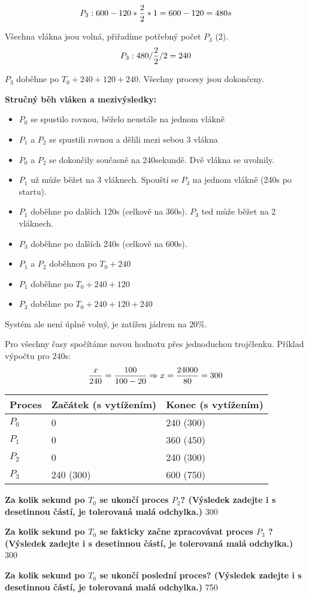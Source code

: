 $$P_3: 600 - 120*{2 \over 2}*1 = 600 - 120 = 480s$$

Všechna vlákna jsou volná, přiřadíme potřebný počet $P_3$ (2).
$$P_3: 480/{2 \over 2}/2 = 240$$

$P_3$ doběhne po $T_0 + 240 + 120 + 240$. Všechny procesy jsou dokončeny.

\textbf{Stručný běh vláken a mezivýsledky:}

\begin{itemize}
    \item $P_0$ se spustilo rovnou, běželo neustále na jednom vlákně
    \item $P_1$ a $P_2$ se spustili rovnou a dělili mezi sebou 3 vlákna
    \item $P_0$ a $P_2$ se dokončily současně na 240sekundě. Dvě vlákna se uvolnily.
    \item $P_1$ už může běžet na 3 vláknech. Spouští se $P_3$ na jednom vlákně (240s po startu).
    \item $P_1$ doběhne po dalších 120s (celkově na 360s). $P_3$ ted může běžet na 2 vláknech.
    \item $P_3$ doběhne po dalších 240s (celkově na 600s).
\end{itemize}

\begin{itemize}
    \item $P_1$ a $P_2$ doběhnou po $T_0 + 240$
    \item $P_1$ doběhne po $T_0 + 240 + 120$
    \item $P_3$ doběhne po $T_0 + 240 + 120 + 240$
\end{itemize}

Systém ale není úplně volný, je zatížen jádrem na $20\%$.

Pro všechny časy spočítáme novou hodnotu přes jednoduchou trojčlenku. Příklad výpočtu pro 240s:
$${x \over 240} = {100 \over {100 - 20}} \Rightarrow x = {24000 \over 80} = 300$$


\begin{table}[h]
    \centering
    \begin{tabular}{ l|l|l }
        \hline
        Proces & Začátek (s vytížením) & Konec (s vytížením)\\
        \hline
        $P_0$ & 0 & 240 (300)\\
        $P_1$ & 0 & 360 (450)\\
        $P_2$ & 0 & 240 (300)\\
        $P_3$ & 240 (300) & 600 (750)\\
        \hline
    \end{tabular}
\end{table}

\textbf{Za kolik sekund po $T_0$ se ukončí proces $P_2$? (Výsledek zadejte i s desetinnou částí, je tolerovaná malá odchylka.)} 300

\textbf{Za kolik sekund po $T_0$ se fakticky začne zpracovávat proces $P_3$ ? (Výsledek zadejte i s desetinnou částí, je tolerovaná malá odchylka.)} 300

\textbf{Za kolik sekund po $T_0$ se ukončí poslední proces? (Výsledek zadejte i s desetinnou částí, je tolerovaná malá odchylka.)} 750